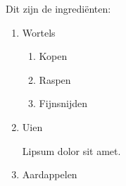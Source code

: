 \documentclass{article}
\begin{document}
Dit zijn de ingrediënten:
\begin{enumerate}
    \item Wortels
    \begin{enumerate}
        \item Kopen
        \item Raspen
        \item Fijnsnijden
    \end{enumerate}
    \item Uien
    
    Lipsum dolor sit amet.
    \item Aardappelen
\end{enumerate}
\end{document}

